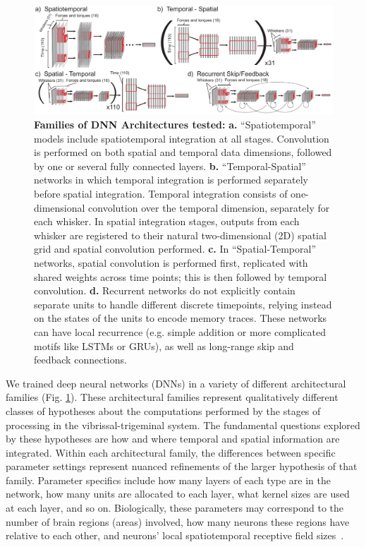 \begin{figure}
\centering
\includegraphics [width=.9\linewidth]{figures/architectures.pdf}
\vspace{-3mm}
\caption{\footnotesize{\textbf{Families of DNN Architectures tested:} \textbf{a.} ``Spatiotemporal'' models include spatiotemporal integration at all stages. Convolution is performed on both spatial and temporal data dimensions, followed by one or several fully connected layers. \textbf{b.} ``Temporal-Spatial'' networks in which temporal integration is performed separately before spatial integration.  Temporal integration consists of one-dimensional convolution over the temporal dimension, separately for each whisker. In spatial integration stages, outputs from each whisker are registered to their natural two-dimensional (2D) spatial grid and spatial convolution performed.  \textbf{c.} In ``Spatial-Temporal'' networks, spatial convolution is performed first, replicated with shared weights across time points; this is then followed by temporal convolution. \textbf{d.} Recurrent networks do not explicitly contain separate units to handle different discrete timepoints, relying instead on the states of the units to encode memory traces.  These networks can have local recurrence (e.g. simple addition or more complicated motifs like LSTMs or GRUs), as well as long-range skip and feedback connections.}~\label{fig_archi}}
\vspace{-5mm}
\end{figure}

We trained deep neural networks (DNNs) in a variety of different architectural families (Fig. \ref{fig_archi}).  
These architectural families represent qualitatively different classes of hypotheses about the computations performed by the stages of processing in the vibrissal-trigeminal system. 
The fundamental questions explored by these hypotheses are how and where temporal and spatial information are integrated.
Within each architectural family, the differences between specific parameter settings represent nuanced refinements of the larger hypothesis of that family.   
Parameter specifics include how many layers of each type are in the network, how many units are allocated to each layer, what kernel sizes are used at each layer, and so on.  
Biologically, these parameters may correspond to the number of brain regions (areas) involved, how many neurons these regions have relative to each other, and neurons' local spatiotemporal receptive field sizes~\cite{yamins2016using}.
 
